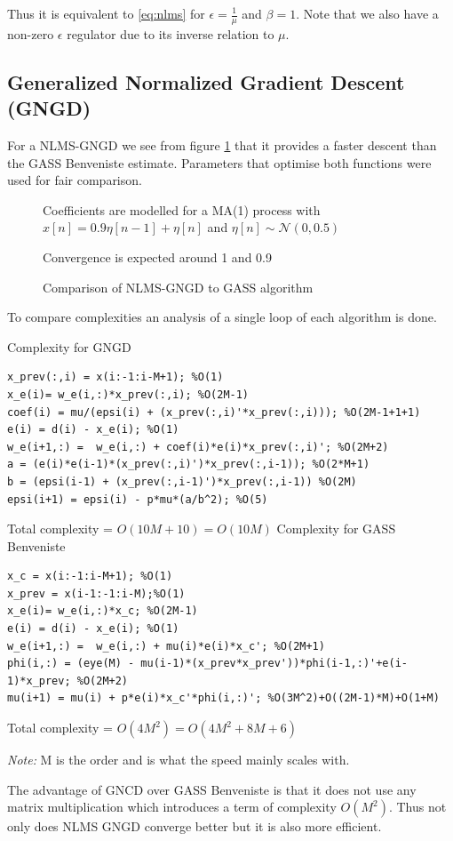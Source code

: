 \documentclass[10pt,twoside,a4paper]{report}
\begin{document}
 Thus it is equivalent to \ref{eq:nlms} for $\epsilon = \frac{1}{\mu}$ and $\beta = 1$. Note that we also have a non-zero $\epsilon$ regulator due to its inverse relation to $\mu$.

\subsection{Generalized Normalized Gradient Descent (GNGD)}
For a NLMS-GNGD we see from figure \ref{fig:4_1c} that it provides a faster descent than the GASS Benveniste estimate. Parameters that optimise both functions were used for fair comparison.
\begin{figure}[h]
\centering
\resizebox{\textwidth}{!}{}
Coefficients are modelled for a MA(1) process with $x[n]=0.9\eta[n-1]+\eta[n]$ and $\eta[n] \sim \mathcal{N}(0,0.5)$

Convergence is expected around 1 and 0.9
\caption{Comparison of NLMS-GNGD to GASS algorithm}
\label{fig:4_1c}
\end{figure}
 
 To compare complexities an analysis of a single loop of each algorithm is done.
 
 
Complexity for GNGD
\begin{lstlisting}
x_prev(:,i) = x(i:-1:i-M+1); %O(1)
x_e(i)= w_e(i,:)*x_prev(:,i); %O(2M-1)
coef(i) = mu/(epsi(i) + (x_prev(:,i)'*x_prev(:,i))); %O(2M-1+1+1)
e(i) = d(i) - x_e(i); %O(1)
w_e(i+1,:) =  w_e(i,:) + coef(i)*e(i)*x_prev(:,i)'; %O(2M+2)
a = (e(i)*e(i-1)*(x_prev(:,i)')*x_prev(:,i-1)); %O(2*M+1)
b = (epsi(i-1) + (x_prev(:,i-1)')*x_prev(:,i-1)) %O(2M)
epsi(i+1) = epsi(i) - p*mu*(a/b^2); %O(5)
\end{lstlisting}
Total complexity = $O(10M+10)=O(10M)$ 
Complexity for GASS Benveniste
\begin{lstlisting}
x_c = x(i:-1:i-M+1); %O(1)
x_prev = x(i-1:-1:i-M);%O(1)
x_e(i)= w_e(i,:)*x_c; %O(2M-1)
e(i) = d(i) - x_e(i); %O(1)
w_e(i+1,:) =  w_e(i,:) + mu(i)*e(i)*x_c'; %O(2M+1)
phi(i,:) = (eye(M) - mu(i-1)*(x_prev*x_prev'))*phi(i-1,:)'+e(i-1)*x_prev; %O(2M+2)
mu(i+1) = mu(i) + p*e(i)*x_c'*phi(i,:)'; %O(3M^2)+O((2M-1)*M)+O(1+M)
\end{lstlisting}
Total complexity = $O(4M^2) = O(4M^2+8M+6)$ 

\textit{Note:} M is the order and is what the speed mainly scales with.

The advantage of GNCD over GASS Benveniste is that it does not use any matrix multiplication which introduces a term of complexity $O(M^2)$. Thus not only does NLMS GNGD converge better but it is also more efficient.
\end{document}
